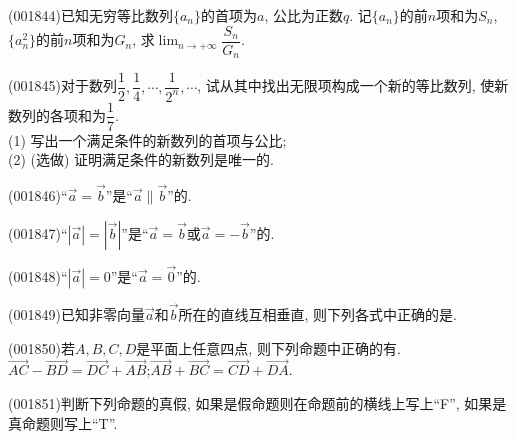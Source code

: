 \item (001844)已知无穷等比数列$\{a_n\}$的首项为$a$, 公比为正数$q$. 记$\{a_n\}$的前$n$项和为$S_n$, $\{a_n^2\}$的前$n$项和为$G_n$, 求$\displaystyle\lim_{n\rightarrow +\infty} \dfrac{S_n}{G_n}$.
\item (001845)对于数列$\dfrac{1}{2},\dfrac{1}{4},\cdots,\dfrac{1}{2^n},\cdots$, 试从其中找出无限项构成一个新的等比数列, 使新数列的各项和为$\dfrac{1}{7}$.\\ 
(1) 写出一个满足条件的新数列的首项与公比;\\ 
(2) (选做) 证明满足条件的新数列是唯一的.
\item (001846)``$\overrightarrow{a}=\overrightarrow{b}$''是``$\overrightarrow{a}\parallel\overrightarrow{b}$''的.
\item (001847)``$|\overrightarrow{a}|=|\overrightarrow{b}|$''是``$\overrightarrow{a}=\overrightarrow{b}$或$\overrightarrow{a}=-\overrightarrow{b}$''的.
\item (001848)``$|\overrightarrow{a}|=0$''是``$\overrightarrow{a}=\overrightarrow{0}$''的.
\item (001849)已知非零向量$\overrightarrow{a}$和$\overrightarrow{b}$所在的直线互相垂直, 则下列各式中正确的是.
\item (001850)若$A,B,C,D$是平面上任意四点, 则下列命题中正确的有.
{$\overrightarrow{AC}-\overrightarrow{BD}=\overrightarrow{DC}+\overrightarrow{AB}$;}{$\overrightarrow{AB}+\overrightarrow{BC}=\overrightarrow{CD}+\overrightarrow{DA}$.}
\item (001851)判断下列命题的真假, 如果是假命题则在命题前的横线上写上``F'', 如果是真命题则写上``T''.\\ 
